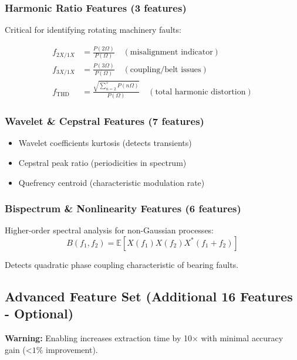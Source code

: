 \documentclass[11pt,a4paper]{article}
\begin{document}
\subsubsection{Harmonic Ratio Features (3 features)}

Critical for identifying rotating machinery faults:

\begin{align}
f_{2X/1X} &= \frac{P(2\Omega)}{P(\Omega)} \quad (\text{misalignment indicator}) \\
f_{3X/1X} &= \frac{P(3\Omega)}{P(\Omega)} \quad (\text{coupling/belt issues}) \\
f_{\text{THD}} &= \frac{\sqrt{\sum_{n=2}^{5} P(n\Omega)}}{P(\Omega)} \quad (\text{total harmonic distortion})
\end{align}

\subsubsection{Wavelet \& Cepstral Features (7 features)}

\begin{itemize}[itemsep=0.2em]
    \item Wavelet coefficients kurtosis (detects transients)
    \item Cepstral peak ratio (periodicities in spectrum)
    \item Quefrency centroid (characteristic modulation rate)
\end{itemize}

\subsubsection{Bispectrum \& Nonlinearity Features (6 features)}

Higher-order spectral analysis for non-Gaussian processes:
\begin{equation}
B(f_1, f_2) = \mathbb{E}[X(f_1)X(f_2)X^*(f_1+f_2)]
\end{equation}

Detects quadratic phase coupling characteristic of bearing faults.

\subsection{Advanced Feature Set (Additional 16 Features - Optional)}

\textbf{Warning:} Enabling increases extraction time by 10× with minimal accuracy gain ($ $<$ 1\%$ improvement).
\end{document}
